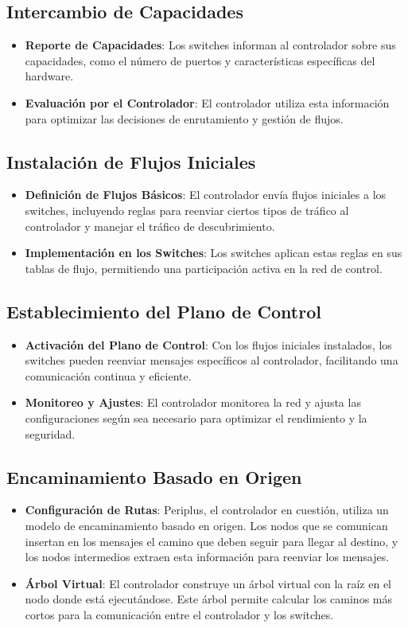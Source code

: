 \documentclass[a4paper, 12pt]{book}
\begin{document}
	\subsection{Intercambio de Capacidades}
	\begin{itemize}
		\item \textbf{Reporte de Capacidades}: Los switches informan al controlador sobre sus capacidades, como el número de puertos y características específicas del hardware.
		\item \textbf{Evaluación por el Controlador}: El controlador utiliza esta información para optimizar las decisiones de enrutamiento y gestión de flujos.
	\end{itemize}
	
	\subsection{Instalación de Flujos Iniciales}
	\begin{itemize}
		\item \textbf{Definición de Flujos Básicos}: El controlador envía flujos iniciales a los switches, incluyendo reglas para reenviar ciertos tipos de tráfico al controlador y manejar el tráfico de descubrimiento.
		\item \textbf{Implementación en los Switches}: Los switches aplican estas reglas en sus tablas de flujo, permitiendo una participación activa en la red de control.
	\end{itemize}
	
	\subsection{Establecimiento del Plano de Control}
	\begin{itemize}
		\item \textbf{Activación del Plano de Control}: Con los flujos iniciales instalados, los switches pueden reenviar mensajes específicos al controlador, facilitando una comunicación continua y eficiente.
		\item \textbf{Monitoreo y Ajustes}: El controlador monitorea la red y ajusta las configuraciones según sea necesario para optimizar el rendimiento y la seguridad.
	\end{itemize}
	
	\subsection{Encaminamiento Basado en Origen}
	\begin{itemize}
		\item \textbf{Configuración de Rutas}: Periplus, el controlador en cuestión, utiliza un modelo de encaminamiento basado en origen. Los nodos que se comunican insertan en los mensajes el camino que deben seguir para llegar al destino, y los nodos intermedios extraen esta información para reenviar los mensajes.
		\item \textbf{Árbol Virtual}: El controlador construye un árbol virtual con la raíz en el nodo donde está ejecutándose. Este árbol permite calcular los caminos más cortos para la comunicación entre el controlador y los switches.
	\end{itemize}
	
\end{document}
